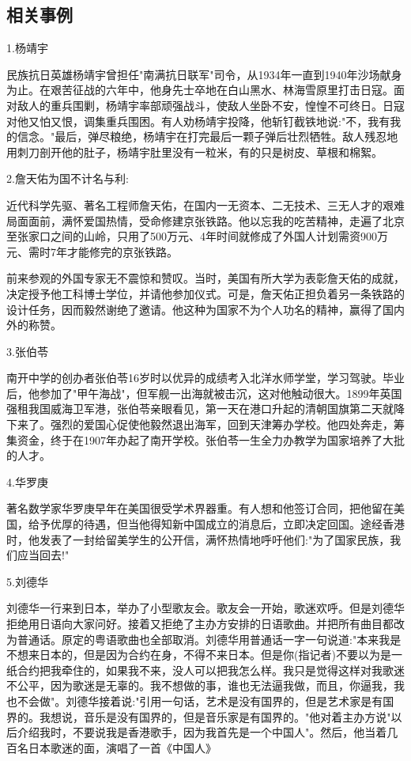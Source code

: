 \documentclass[UTF8]{ctexart}
\begin{document}
\subsection{相关事例}\par
1.杨靖宇\par
民族抗日英雄杨靖宇曾担任"南满抗日联军"司令，从1934年一直到1940年沙场献身为止。在艰苦征战的六年中，他身先士卒地在白山黑水、林海雪原里打击日寇。面对敌人的重兵围剿，杨靖宇率部顽强战斗，使敌人坐卧不安，惶惶不可终日。日寇对他又怕又恨，调集重兵围困。有人劝杨靖宇投降，他斩钉截铁地说:"不，我有我的信念。"最后，弹尽粮绝，杨靖宇在打完最后一颗子弹后壮烈牺牲。敌人残忍地用刺刀剖开他的肚子，杨靖宇肚里没有一粒米，有的只是树皮、草根和棉絮。\par
2.詹天佑为国不计名与利:\par
近代科学先驱、著名工程师詹天佑，在国内一无资本、二无技术、三无人才的艰难局面面前，满怀爱国热情，受命修建京张铁路。他以忘我的吃苦精神，走遍了北京至张家口之间的山岭，只用了500万元、4年时间就修成了外国人计划需资900万元、需时7年才能修完的京张铁路。\par
前来参观的外国专家无不震惊和赞叹。当时，美国有所大学为表彰詹天佑的成就，决定授予他工科博士学位，并请他参加仪式。可是，詹天佑正担负着另一条铁路的设计任务，因而毅然谢绝了邀请。他这种为国家不为个人功名的精神，赢得了国内外的称赞。\par
3.张伯苓\par
南开中学的创办者张伯苓16岁时以优异的成绩考入北洋水师学堂，学习驾驶。毕业后，他参加了"甲午海战"，但军舰一出海就被击沉，这对他触动很大。1899年英国强租我国威海卫军港，张伯苓亲眼看见，第一天在港口升起的清朝国旗第二天就降下来了。强烈的爱国心促使他毅然退出海军，回到天津筹办学校。他四处奔走，筹集资金，终于在1907年办起了南开学校。张伯苓一生全力办教学为国家培养了大批的人才。\par
4.华罗庚\par
著名数学家华罗庚早年在美国很受学术界器重。有人想和他签订合同，把他留在美国，给予优厚的待遇，但当他得知新中国成立的消息后，立即决定回国。途经香港时，他发表了一封给留美学生的公开信，满怀热情地呼吁他们:"为了国家民族，我们应当回去!"\par
5.刘德华\par
刘德华一行来到日本，举办了小型歌友会。歌友会一开始，歌迷欢呼。但是刘德华拒绝用日语向大家问好。接着又拒绝了主办方安排的日语歌曲。并把所有曲目都改为普通话。原定的粤语歌曲也全部取消。刘德华用普通话一字一句说道:"本来我是不想来日本的，但是因为合约在身，不得不来日本。但是你(指记者)不要以为是一纸合约把我牵住的，如果我不来，没人可以把我怎么样。我只是觉得这样对我歌迷不公平，因为歌迷是无辜的。我不想做的事，谁也无法逼我做，而且，你逼我，我也不会做"。刘德华接着说:"引用一句话，艺术是没有国界的，但是艺术家是有国界的。我想说，音乐是没有国界的，但是音乐家是有国界的。"他对着主办方说"以后介绍我时，不要说我是香港歌手，因为我首先是一个中国人"。然后，他当着几百名日本歌迷的面，演唱了一首《中国人》\par
\end{document}

